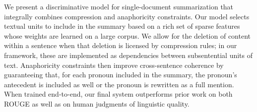We present a discriminative model for single-document summarization that integrally combines compression and anaphoricity constraints. Our model selects textual units to include in the summary based on a rich set of sparse features whose weights are learned on a large corpus. We allow for the deletion of content within a sentence when that deletion is licensed by compression rules; in our framework, these are implemented as dependencies between subsentential units of text. Anaphoricity constraints then improve cross-sentence coherence by guaranteeing that, for each pronoun included in the summary, the pronoun's antecedent is included as well or the pronoun is rewritten as a full mention. When trained end-to-end, our final system outperforms prior work on both ROUGE as well as on human judgments of linguistic quality.
